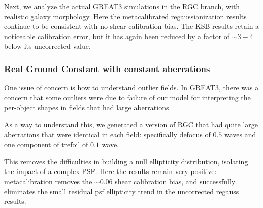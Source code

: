 \documentclass[iop]{emulateapj}
\begin{document}
Next, we analyze the actual GREAT3 simulations in the RGC branch, with
realistic galaxy morphology. Here the metacalibrated regaussianization
results continue to be consistent with no shear calibration bias. The
KSB results retain a noticeable calibration error, but it has again
been reduced by a factor of $\sim3-4$ below its uncorrected value. 



\subsubsection{Real Ground Constant with constant aberrations}

One issue of concern is how to understand outlier fields.  In GREAT3,
there was a concern that some outliers were due to failure of our
model for interpreting the per-object shapes in fields that had large
aberrations.

As a way to understand this, we generated a version of RGC that had
quite large aberrations that were identical in each field:
specifically defocus of $0.5$ waves and one component of trefoil of
$0.1$ wave.

This removes the difficulties in building a null ellipticity
distribution, isolating the impact of a complex PSF. Here the results
remain very positive: metacalibration removes the $\sim0.06$ shear
calibration bias, and successfully eliminates the small residual psf
ellipticity trend in the uncorrected regauss results.
\end{document}
